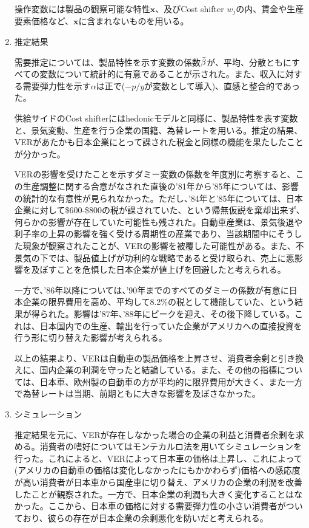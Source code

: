 \documentclass{jsarticle}
\begin{document}
\begin{enumerate}
操作変数には製品の観察可能な特性$\mathbf{x}$、及びCost shifter $w_j$の内、賃金や生産要素価格など、$\mathbf{x}$に含まれないものを用いる。

\item 推定結果
 
需要推定については、製品特性を示す変数の係数$\Bar{\beta}$が、平均、分散ともにすべての変数について統計的に有意であることが示された。また、収入に対する需要弾力性を示す$\alpha$は正で($-p/y$が変数として導入)、直感と整合的であった。

\vspace{2zw}

供給サイドのCost shifterにはhedonicモデルと同様に、製品特性を表す変数と、景気変動、生産を行う企業の国籍、為替レートを用いる。推定の結果、VERがあたかも日本企業にとって課された税金と同様の機能を果たしたことが分かった。

VERの影響を受けたことを示すダミー変数の係数を年度別に考察すると、この生産調整に関する合意がなされた直後の'81年から'85年については、影響の統計的な有意性が見られなかった。ただし、'84年と'85年については、日本企業に対して\$600-\$800の税が課されていた、という帰無仮説を棄却出来ず、何らかの影響が存在していた可能性も残された。自動車産業は、景気後退や利子率の上昇の影響を強く受ける周期性の産業であり、当該期間中にそうした現象が観察されたことが、VERの影響を被覆した可能性がある。また、不景気の下では、製品値上げが功利的な戦略であると受け取られ、売上に悪影響を及ぼすことを危惧した日本企業が値上げを回避したと考えられる。

一方で、'86年以降については、'90年までのすべてのダミーの係数が有意に日本企業の限界費用を高め、平均して8.2\%の税として機能していた、という結果が得られた。影響は'87年、'88年にピークを迎え、その後下降している。これは、日本国内での生産、輸出を行っていた企業がアメリカへの直接投資を行う形に切り替えた影響が考えられる。

以上の結果より、VERは自動車の製品価格を上昇させ、消費者余剰と引き換えに、国内企業の利潤を守ったと結論している。また、その他の指標については、日本車、欧州製の自動車の方が平均的に限界費用が大きく、また一方で為替レートは当期、前期ともに大きな影響を及ぼさなかった。

\item シミュレーション
 
 推定結果を元に、VERが存在しなかった場合の企業の利益と消費者余剰を求める。消費者の嗜好についてはモンテカルロ法を用いてシミュレーションを行った。これによると、VERによって日本車の価格は上昇し、これによって(アメリカの自動車の価格は変化しなかったにもかかわらず)価格への感応度が高い消費者が日本車から国産車に切り替え、アメリカの企業の利潤を改善したことが観察された。一方で、日本企業の利潤も大きく変化することはなかった。ここから、日本車の価格に対する需要弾力性の小さい消費者がついており、彼らの存在が日本企業の余剰悪化を防いだと考えられる。
 

\end{enumerate}
\end{document}
